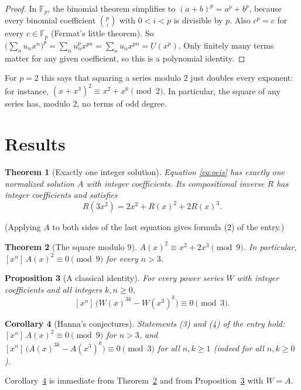 \documentclass[11pt,a4paper]{article}
\newtheorem{theorem}{Theorem}[section]
\newtheorem{corollary}[theorem]{Corollary}
\newtheorem{proposition}[theorem]{Proposition}
\theoremstyle{definition}
\theoremstyle{remark}
\newcommand{\F}{\mathbb{F}}
\newcommand{\coeff}[2]{[x^{#1}]\,#2}
\begin{document}
\begin{proof}
In $\F_p$, the binomial theorem simplifies to $(a+b)^p=a^p+b^p$, because every binomial coefficient
$\binom pi$ with $0<i<p$ is divisible by $p$. Also $c^p=c$ for every $c\in\F_p$ (Fermat's little theorem). So
$\bigl(\sum_nu_nx^n\bigr)^p=\sum_nu_n^px^{pn}=\sum_nu_nx^{pn}=U(x^p)$. Only finitely many terms matter for any given
coefficient, so this is a polynomial identity.
\end{proof}

For $p=2$ this says that squaring a series modulo $2$ just doubles every exponent: for instance,
$(x+x^3)^2\equiv x^2+x^6\pmod2$. In particular, the square of any series has, modulo $2$, no terms of odd degree.


\section{Results}\label{sec:results}

\begin{theorem}[Exactly one integer solution]\label{thm:exist}
Equation \eqref{eq:oeis} has exactly one normalized solution $A$ with integer coefficients. Its compositional inverse
$R$ has integer coefficients and satisfies
\[
R(3x^2)=2x^2+R(x)^2+2R(x)^3 .
\]
\end{theorem}
(Applying $A$ to both sides of the last equation gives formula (2) of the entry.)

\begin{theorem}[The square modulo $9$]\label{thm:nine}
$A(x)^2\equiv x^2+2x^3\pmod 9$. In particular, $\coeff{n}{A(x)^2}\equiv0\pmod 9$ for every $n>3$.
\end{theorem}

\begin{proposition}[A classical identity]\label{prop:frob}
For every power series $W$ with integer coefficients and all integers $k,n\ge0$,
\[
\coeff{n}{\bigl(W(x)^{3k}-W(x^3)^k\bigr)}\equiv0\pmod 3 .
\]
\end{proposition}

\begin{corollary}[Hanna's conjectures]\label{cor:conj}
Statements (3) and (4) of the entry hold: $\coeff{n}{A(x)^2}\equiv0\pmod9$ for $n>3$, and
$\coeff{n}{\bigl(A(x)^{3k}-A(x^3)^k\bigr)}\equiv0\pmod3$ for all $n,k\ge1$ (indeed for all $n,k\ge0$).
\end{corollary}
Corollary~\ref{cor:conj} is immediate from Theorem~\ref{thm:nine} and from Proposition~\ref{prop:frob} with $W=A$.
\end{document}
